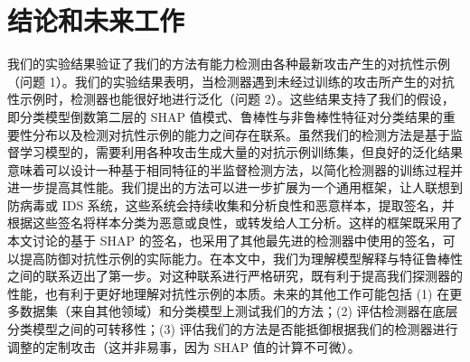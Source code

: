 \documentclass[12pt, a4paper]{ctexart} %
\begin{document}
\section{结论和未来工作}
我们的实验结果验证了我们的方法有能力检测由各种最新攻击产生的对抗性示例（问题 1）。我们的实验结果表明，当检测器遇到未经过训练的攻击所产生的对抗性示例时，检测器也能很好地进行泛化（问题 2）。这些结果支持了我们的假设，即分类模型倒数第二层的 SHAP 值模式、鲁棒性与非鲁棒性特征对分类结果的重要性分布以及检测对抗性示例的能力之间存在联系。虽然我们的检测方法是基于监督学习模型的，需要利用各种攻击生成大量的对抗示例训练集，但良好的泛化结果意味着可以设计一种基于相同特征的半监督检测方法，以简化检测器的训练过程并进一步提高其性能。我们提出的方法可以进一步扩展为一个通用框架，让人联想到防病毒或 IDS 系统，这些系统会持续收集和分析良性和恶意样本，提取签名，并根据这些签名将样本分类为恶意或良性，或转发给人工分析。这样的框架既采用了本文讨论的基于 SHAP 的签名，也采用了其他最先进的检测器中使用的签名，可以提高防御对抗性示例的实际能力。在本文中，我们为理解模型解释与特征鲁棒性之间的联系迈出了第一步。对这种联系进行严格研究，既有利于提高我们探测器的性能，也有利于更好地理解对抗性示例的本质。未来的其他工作可能包括 (1) 在更多数据集（来自其他领域）和分类模型上测试我们的方法；(2) 评估检测器在底层分类模型之间的可转移性；(3) 评估我们的方法是否能抵御根据我们的检测器进行调整的定制攻击（这并非易事，因为 SHAP 值的计算不可微）。
\end{document}
